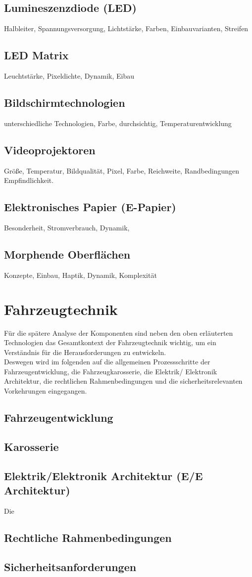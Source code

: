 \subsection{Lumineszenzdiode (LED)}
Halbleiter, Spannungsversorgung, Lichtstärke, Farben, Einbauvarianten, Streifen
\cite{G}
\subsection{LED Matrix}
Leuchtstärke, Pixeldichte, Dynamik, Eibau
\subsection{Bildschirmtechnologien}
unterschiedliche Technologien, Farbe, durchsichtig, Temperaturentwicklung
\subsection{Videoprojektoren}
Größe, Temperatur, Bildqualität, Pixel, Farbe, Reichweite, Randbedingungen Empfindlichkeit.
\subsection{Elektronisches Papier (E-Papier)}
Besonderheit, Stromverbrauch, Dynamik,
\subsection{Morphende Oberflächen}
Konzepte, Einbau, Haptik, Dynamik, Komplexität

\section{Fahrzeugtechnik}
Für die spätere Analyse der Komponenten sind neben den oben erläuterten Technologien das Gesamtkontext der Fahrzeugtechnik wichtig, um ein Verständnis für die Herausforderungen zu entwickeln.\\
Deswegen wird im folgenden auf die allgemeinen Prozessschritte der Fahrzeugentwicklung, die Fahrzeugkarosserie, die Elektrik/ Elektronik Architektur, die rechtlichen Rahmenbedingungen und die sicherheitsrelevanten Vorkehrungen eingegangen.
\subsection{Fahrzeugentwicklung}
\subsection{Karosserie}
\subsection{Elektrik/Elektronik Architektur (E/E Architektur)}
Die


\subsection{Rechtliche Rahmenbedingungen}

\subsection{Sicherheitsanforderungen}